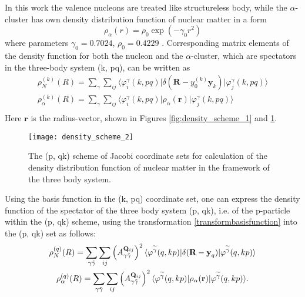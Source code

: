 \documentclass[
12pt, %
oneside, %
english, %
onehalfspacing, %
onehalfspacing, %
headsepline, %
]{MastersDoctoralThesis} %
\begin{document}
In this work 
the valence nucleons are treated like structureless body, 
while the $\alpha$-cluster has own density distribution function of nuclear matter in a form
\begin{equation}
\rho_\alpha(r)=\rho_0 \exp\left(-\gamma_0 r^2 \right)
\label{alpha_density}
\end{equation}
 where parameters $ \gamma_0= 0.7024$, $  \displaystyle \rho_0=0.4229$ \cite{satchler1979folding}. Corresponding matrix elements of the density function for both the nucleon and the $\alpha$-cluster, which are spectators in the three-body system (k, pq), can be written as 
\begin{equation}
\label{densities}
\begin{gathered}
\rho_{N}^{(k)}({R})=
\sum_{\gamma}
\sum_{ij}
\langle\varphi^{{\gamma}}_i(k, pq) 
\vert \delta(\textbf{R}-y_0^{(k)}\textbf{y}_k)
\vert \varphi^{{\gamma}}_j(k, pq)\rangle \\
\rho_{\alpha}^{(k)}({R})= 
\sum_{\gamma}
\sum_{ij}
\langle\varphi^{{\gamma}}_i(k, pq) 
\vert \rho_{\alpha}(\textbf{r}) 
\vert \varphi^{{\gamma}}_j(k, pq)\rangle \\
\end{gathered}
\end{equation}
Here $\textbf{r}$ is the radius-vector, shown in Figures \ref{fig:density_scheme_1} and \ref{fig:density_scheme_2}.

\begin{figure}[t]
\centering
\texttt{[image: density\_scheme\_2]}
\decoRule
\caption{\footnotesize The (p, qk) scheme of Jacobi coordinate sets for calculation of the density distribution function of nuclear matter in the framework of  the three body system. }
\label{fig:density_scheme_2}
\end{figure}


Using the basis function in the (k, pq) coordinate set, one can express the density function of the spectator of the three body system (p, qk), i.e. of the p-particle within the (p, qk) scheme,   using the transformation \eqref{transformbasisfunction} into the (p, qk) set as follows: 
\begin{align}
\begin{gathered}
\rho_{N}^{(q)}({R})=
\sum_{\gamma \tilde{\gamma}}
\sum_{ij}
\left( A_{\gamma\tilde{\gamma}}^{ {\bf Q}_{ij} } \right)^2
\langle \varphi^{ \widetilde{\gamma} }(q,kp) 
\vert \delta(\textbf{R}-\textbf{y}_q)
\vert \varphi^{\widetilde{\gamma}}(q,kp)\rangle \\
\rho_{\alpha}^{(q)}({R})= 
\sum_{\gamma \tilde{\gamma}}
\sum_{ij}
\left( A_{\gamma\tilde{\gamma}}^{ {\bf Q}_{ij} } \right)^2
\langle \varphi^{ \widetilde{\gamma} }(q,kp)
\vert \rho_{\alpha}(\textbf{r})
\vert \varphi^{\widetilde{\gamma}}(q,kp)\rangle.\\
\end{gathered}
\end{align}
\end{document}
